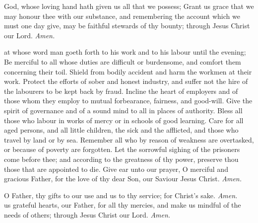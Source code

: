  God, whose loving hand hath given us all that we possess; Grant us grace that we may honour thee with our substance, and remembering the account which we must one day give, may be faithful stewards of thy bounty; through Jesus Christ our Lord. \textit{Amen.}

 at whose word man goeth forth to his work and to his labour until the evening; Be merciful to all whose duties are difficult or burdensome, and comfort them concerning their toil. Shield from bodily accident and harm the workmen at their work. Protect the efforts of sober and honest industry, and suffer not the hire of the labourers to be kept back by fraud. Incline the heart of employers and of those whom they employ to mutual forbearance, fairness, and good-will. Give the spirit of governance and of a sound mind to all in places of authority. Bless all those who labour in works of mercy or in schools of good learning. Care for all aged persons, and all little children, the sick and the afflicted, and those who travel by land or by sea. Remember all who by reason of weakness are overtasked, or because of poverty are forgotten. Let the sorrowful sighing of the prisoners come before thee; and according to the greatness of thy power, preserve thou those that are appointed to die. Give ear unto our prayer, O merciful and gracious Father, for the love of thy dear Son, our Saviour Jesus Christ. \textit{Amen.}

 O Father, thy gifts to our use and us to thy service; for Christ's sake. \textit{Amen.}\\
 us grateful hearts, our Father, for all thy mercies, and make us mindful of the needs of others; through Jesus Christ our Lord. \textit{Amen.}